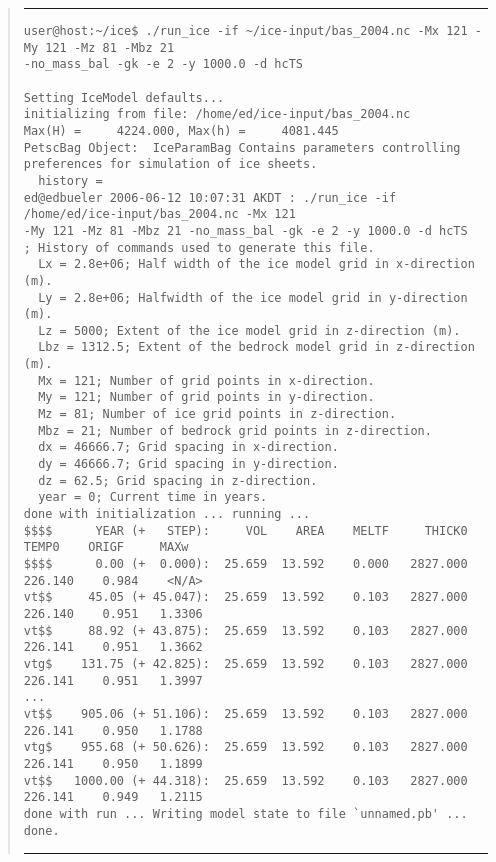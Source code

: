 \documentclass[11pt,final]{amsart}
\newcommand{\Vend}{ \rule{4.6in}{0.1mm}\end{quote}\normalsize }
\newcommand{\beginV}{ \scriptsize\begin{quote}\rule{4.6in}{0.1mm}\begin{verbatim} }
\begin{document}
\beginV
user@host:~/ice$ ./run_ice -if ~/ice-input/bas_2004.nc -Mx 121 -My 121 -Mz 81 -Mbz 21
-no_mass_bal -gk -e 2 -y 1000.0 -d hcTS

Setting IceModel defaults...
initializing from file: /home/ed/ice-input/bas_2004.nc
Max(H) =     4224.000, Max(h) =     4081.445
PetscBag Object:  IceParamBag Contains parameters controlling
preferences for simulation of ice sheets.
  history =
ed@edbueler 2006-06-12 10:07:31 AKDT : ./run_ice -if /home/ed/ice-input/bas_2004.nc -Mx 121
-My 121 -Mz 81 -Mbz 21 -no_mass_bal -gk -e 2 -y 1000.0 -d hcTS
; History of commands used to generate this file.
  Lx = 2.8e+06; Half width of the ice model grid in x-direction (m).
  Ly = 2.8e+06; Halfwidth of the ice model grid in y-direction (m).
  Lz = 5000; Extent of the ice model grid in z-direction (m).
  Lbz = 1312.5; Extent of the bedrock model grid in z-direction (m).
  Mx = 121; Number of grid points in x-direction.
  My = 121; Number of grid points in y-direction.
  Mz = 81; Number of ice grid points in z-direction.
  Mbz = 21; Number of bedrock grid points in z-direction.
  dx = 46666.7; Grid spacing in x-direction.
  dy = 46666.7; Grid spacing in y-direction.
  dz = 62.5; Grid spacing in z-direction.
  year = 0; Current time in years.
done with initialization ... running ...
$$$$      YEAR (+   STEP):     VOL    AREA    MELTF     THICK0     TEMP0    ORIGF     MAXw
$$$$      0.00 (+  0.000):  25.659  13.592    0.000   2827.000   226.140    0.984    <N/A>
vt$$     45.05 (+ 45.047):  25.659  13.592    0.103   2827.000   226.140    0.951   1.3306
vt$$     88.92 (+ 43.875):  25.659  13.592    0.103   2827.000   226.141    0.951   1.3662
vtg$    131.75 (+ 42.825):  25.659  13.592    0.103   2827.000   226.141    0.951   1.3997
...
vt$$    905.06 (+ 51.106):  25.659  13.592    0.103   2827.000   226.141    0.950   1.1788
vtg$    955.68 (+ 50.626):  25.659  13.592    0.103   2827.000   226.141    0.950   1.1899
vt$$   1000.00 (+ 44.318):  25.659  13.592    0.103   2827.000   226.141    0.949   1.2115
done with run ... Writing model state to file `unnamed.pb' ... done.
\end{verbatim}
\Vend
\end{document}
